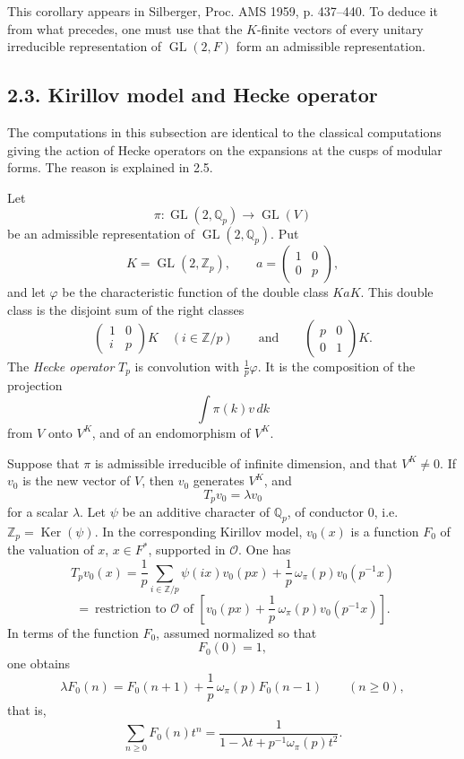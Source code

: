 \documentclass[10pt,a4paper]{article}
\providecommand{\GL}{\operatorname{GL}}
\providecommand{\Q}{\mathbb Q}
\providecommand{\Z}{\mathbb Z}
\providecommand{\OO}{\mathcal O}
\begin{document}
This corollary appears in Silberger, Proc. AMS 1959, p. 437--440. To deduce it from what precedes, one must use that the \(K\)-finite vectors of every unitary irreducible representation of \(\GL(2,F)\) form an admissible representation.

\subsection*{2.3. Kirillov model and Hecke operator}

The computations in this subsection are identical to the classical computations giving the action of Hecke operators on the expansions at the cusps of modular forms. The reason is explained in 2.5.

Let
\[
\pi:\GL(2,\Q_p)\longrightarrow\GL(V)
\]
be an admissible representation of \(\GL(2,\Q_p)\). Put
\[
K=\GL(2,\Z_p),\qquad
a=\begin{pmatrix}1&0\\0&p\end{pmatrix},
\]
and let \(\varphi\) be the characteristic function of the double class \(KaK\). This double class is the disjoint sum of the right classes
\[
\begin{pmatrix}1&0\\ i&p\end{pmatrix}K\quad(i\in\Z/p)
\qquad\text{and}\qquad
\begin{pmatrix}p&0\\0&1\end{pmatrix}K.
\]
The \emph{Hecke operator} \(T_p\) is convolution with \(\frac1p\varphi\). It is the composition of the projection
\[
\int\pi(k)v\,dk
\]
from \(V\) onto \(V^K\), and of an endomorphism of \(V^K\).

\clearpage
{}
\hypertarget{authority-30}{}
Suppose that \(\pi\) is admissible irreducible of infinite dimension, and that \(V^K\ne0\). If \(v_0\) is the new vector of \(V\), then \(v_0\) generates \(V^K\), and
\[
T_pv_0=\lambda v_0
\]
for a scalar \(\lambda\). Let \(\psi\) be an additive character of \(\Q_p\), of conductor \(0\), i.e. \(\Z_p=\operatorname{Ker}(\psi)\). In the corresponding Kirillov model, \(v_0(x)\) is a function \(F_0\) of the valuation of \(x\), \(x\in F^*\), supported in \(\OO\). One has
\[
T_pv_0(x)=
\frac1p\sum_{i\in\Z/p}\psi(ix)v_0(px)
+\frac1p\,\omega_\pi(p)v_0(p^{-1}x)
\]
\[
=\ \text{restriction to }\OO\text{ of }
\left[v_0(px)+\frac1p\,\omega_\pi(p)v_0(p^{-1}x)\right].
\]
In terms of the function \(F_0\), assumed normalized so that
\[
F_0(0)=1,
\]
one obtains
\[
\lambda F_0(n)=F_0(n+1)+\frac1p\,\omega_\pi(p)F_0(n-1)
\qquad(n\ge0),
\]
that is,
\[
\sum_{n\ge0}F_0(n)t^n
=
\frac1{1-\lambda t+p^{-1}\omega_\pi(p)t^2}.
\]
\end{document}
